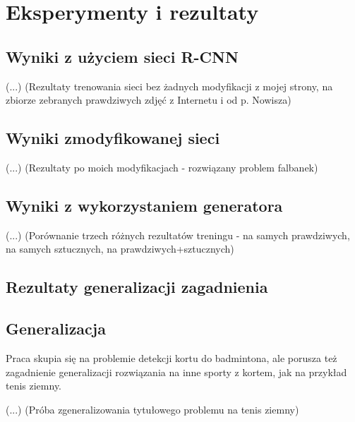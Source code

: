 \chapter{Eksperymenty i rezultaty}

\section{Wyniki z użyciem sieci R-CNN}

(...) (Rezultaty trenowania sieci bez żadnych modyfikacji z mojej strony, na zbiorze zebranych prawdziwych zdjęć z Internetu i od p. Nowisza)

\section{Wyniki zmodyfikowanej sieci}

(...) (Rezultaty po moich modyfikacjach - rozwiązany problem falbanek)

\section{Wyniki z wykorzystaniem generatora}

(...) (Porównanie trzech różnych rezultatów treningu - na samych prawdziwych, na samych sztucznych, na prawdziwych+sztucznych)

\section{Rezultaty generalizacji zagadnienia}

\section{Generalizacja}

Praca skupia się na problemie detekcji kortu do badmintona, ale porusza też zagadnienie generalizacji rozwiązania na inne sporty z kortem, jak na przykład tenis ziemny.

(...) (Próba zgeneralizowania tytułowego problemu na tenis ziemny)
